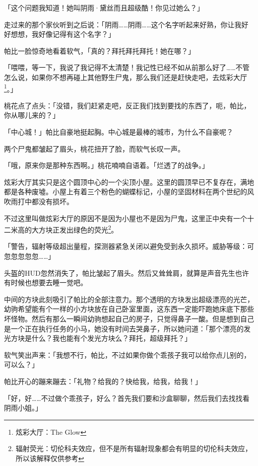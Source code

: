 「这个问题我知道！她叫阴雨·黛丝而且超级酷！你见过她么？」

走过来的那个家伙听到之后说：「阴雨……阴雨……这个名字听起来好熟，你让我好好想想，我好像记得有这个名字？」

帕比一脸惊奇地看着软气，「真的？拜托拜托拜托！她在哪？」

「喂喂，等一下，我说了我记得不太清楚！我记性已经不如从前那么好了……不管怎么说，如果你不想再碰上其他野生尸鬼，那么我们还是赶快走吧，去炫彩大厅\footnote{炫彩大厅：The Glow}。」

桃花点了点头：「没错，我们赶紧走吧，反正我们找到要找的东西了，呃，帕比，你从哪儿来的？」

「中心城！」帕比自豪地挺起胸。中心城是最棒的城市，为什么不自豪呢？

两个尸鬼都皱起了眉头，桃花扭开了脸，而软气长叹一声。

「哦，原来你是那种东西啊。」桃花喃喃自语着。「烂透了的战争。」

\horizonline


炫彩大厅其实只是这个圆顶中心的一个尖顶小屋。这里的圆顶早已不复存在，满地都是各种废墟。小屋上有着三个粉色的蝴蝶标记，小屋的坚固材料在两个世纪的风吹雨打中都没有损坏。

不过这里叫做炫彩大厅的原因不是因为小屋也不是因为尸鬼，这里正中央有一个十二米高的大方块正发出绿色的荧光\footnote{辐射荧光：切伦科夫效应，但不是所有辐射现象都会有明显的切伦科夫效应，所以该解释仅供参考}。

「{\mt 警告，辐射等级超出量程，探测器紧急关闭以避免受到永久损坏。威胁等级：可忽忽忽忽忽……}」

头盔的HUD忽然消失了，帕比皱起了眉头。然后又耸耸肩，就算是声音先生也许有时候也想要去睡一觉吧。

中间的方块此刻吸引了帕比的全部注意力。那个透明的方块发出超级漂亮的光芒，幼驹希望能有个一样的小方块放在自己卧室里面，这东西一定能吓跑她床底下那些坏怪物。然后有那么一瞬间幼驹想起自己的房子，只觉得鼻子一酸。但是想到自己是一个正在执行任务的小马，她没有时间去哭鼻子，所以她问道：「那个漂亮的发光方块是什么？我也能有个发光方块么？拜托，超级拜托？」

软气笑出声来：「我想不行，帕比，不过如果你做个乖孩子我可以给你点儿别的，可以么？」

帕比开心的蹦来蹦去：「礼物？给我的？快给我，给我，给我！」

「好，好……不过做个乖孩子，好么？首先我们要和沙盒聊聊，然后我们去找找看阴雨小姐。」


